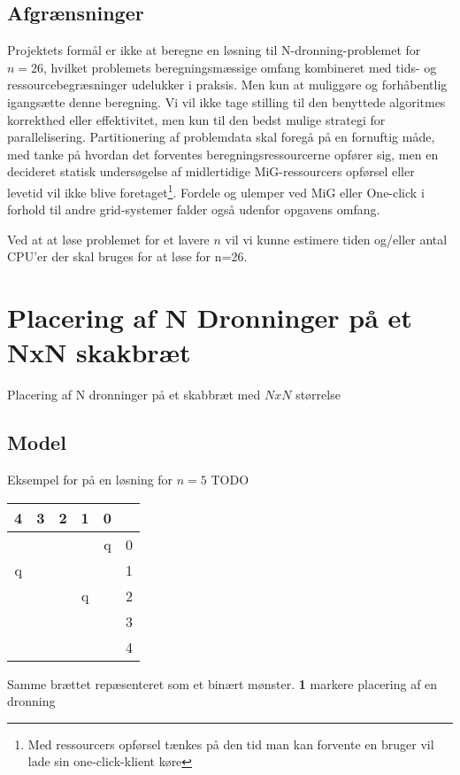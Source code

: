 \documentclass[a4,10pt]{article}
\def\chs#1{{\chessfont#1}}
\begin{document}
\subsection{Afgrænsninger}
%

Projektets formål er ikke at beregne en løsning til N-dronning-problemet for $n=26$, hvilket problemets beregningsmæssige omfang kombineret med tids- og ressourcebegræsninger udelukker i praksis. Men kun at muliggøre og forhåbentlig igangsætte denne beregning. 
Vi vil ikke tage stilling til den benyttede algoritmes korrekthed eller effektivitet, men kun til den bedst mulige strategi for parallelisering. Partitionering af problemdata skal foregå på en fornuftig måde, med tanke på hvordan det forventes beregningsressourcerne opfører sig, men en decideret statisk undersøgelse af midlertidige MiG-ressourcers opførsel eller levetid vil ikke blive foretaget\footnote{Med ressourcers opførsel tænkes på den tid man kan forvente en bruger vil lade sin one-click-klient køre}. Fordele og ulemper ved MiG eller One-click i forhold til andre grid-systemer falder også udenfor opgavens omfang. 

Ved at at løse problemet for et lavere $n$ vil vi kunne estimere tiden og/eller antal CPU'er der skal bruges for at løse for n=26.

\section{Placering af N Dronninger på et NxN skakbræt}

Placering af N dronninger på et skabbræt med $NxN$ størrelse
	
\subsection{Model}
Eksempel for på en løsning for $n=5$
TODO
\begin{tabular}{|c|c|c|c|c|l}
       4 & 3 & 2 & 1 &  0 & \\
\hline &  &  &  & \chs{q} & 0 \\
\hline \chs{q} &  &  &  &  		  & 1 \\
\hline &  &  & \chs{q} &  & 2\\
\hline &  &  &  &  		  & 3 \\
\hline & \Q &  &  &  		  & 4\\
\hline
\end{tabular}

Samme brættet repæsenteret som et binært mønster. \textbf{1} markere  placering af en dronning 
\end{document}
